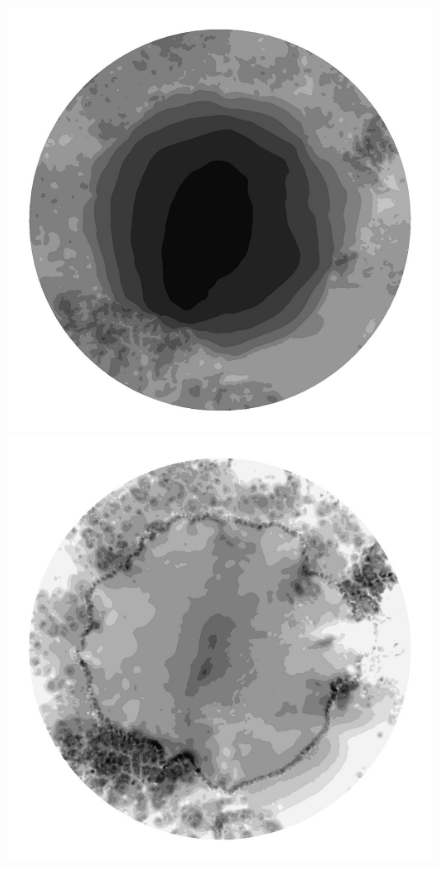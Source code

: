 \begin{figure}
  \begin{minipage}[b]{0.30\linewidth}
    \includegraphics[width=1.0\textwidth]{images/EISMINT_II/Ubar/S_10000.jpg}
  \end{minipage}
  \quad
  \begin{minipage}[b]{0.30\linewidth}
    \includegraphics[width=1.0\textwidth]{images/EISMINT_II/Ubar/beta_10000.jpg}

\end{minipage}
\end{figure}
